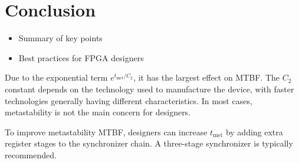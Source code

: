 \documentclass{article}
\begin{document}
\section{Conclusion}
\begin{itemize}
    \item Summary of key points
    \item Best practices for FPGA designers
\end{itemize}
Due to the exponential term \( e^{t_{\text{met}} / C_2} \), it has the largest effect on MTBF. The \( C_2 \) constant depends on the technology used to manufacture the device, with faster technologies generally having different characteristics. In most cases, metastability is not the main concern for designers.

To improve metastability MTBF, designers can increase \( t_{\text{met}} \) by adding extra register stages to the synchronizer chain. A three-stage synchronizer is typically recommended.

\newpage

\end{document}
